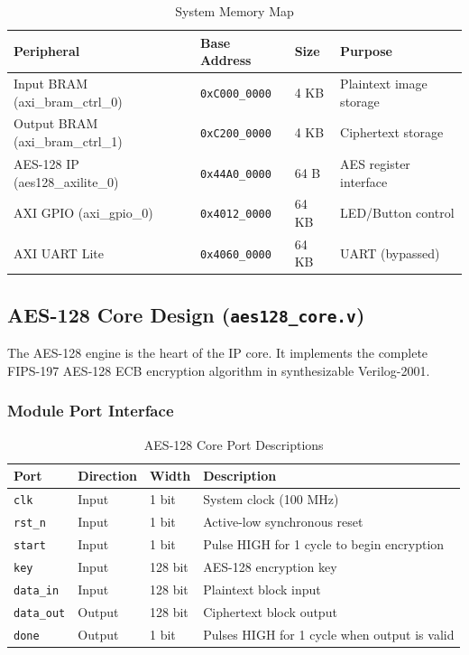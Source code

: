 \begin{table}[H]
\centering
\caption{System Memory Map}
\begin{tabular}{llll}
\toprule
\textbf{Peripheral} & \textbf{Base Address} & \textbf{Size} & \textbf{Purpose} \\
\midrule
Input BRAM (axi\_bram\_ctrl\_0)  & \texttt{0xC000\_0000} & 4 KB & Plaintext image storage \\
Output BRAM (axi\_bram\_ctrl\_1) & \texttt{0xC200\_0000} & 4 KB & Ciphertext storage \\
AES-128 IP (aes128\_axilite\_0)  & \texttt{0x44A0\_0000} & 64 B & AES register interface \\
AXI GPIO (axi\_gpio\_0)          & \texttt{0x4012\_0000} & 64 KB & LED/Button control \\
AXI UART Lite                    & \texttt{0x4060\_0000} & 64 KB & UART (bypassed) \\
\bottomrule
\end{tabular}
\end{table}

\subsection{AES-128 Core Design (\texttt{aes128\_core.v})}

The AES-128 engine is the heart of the IP core. It implements the complete FIPS-197 AES-128 ECB encryption algorithm in synthesizable Verilog-2001.

\subsubsection{Module Port Interface}

\begin{table}[H]
\centering
\caption{AES-128 Core Port Descriptions}
\begin{tabular}{llll}
\toprule
\textbf{Port} & \textbf{Direction} & \textbf{Width} & \textbf{Description} \\
\midrule
\texttt{clk}      & Input  & 1 bit  & System clock (100 MHz) \\
\texttt{rst\_n}   & Input  & 1 bit  & Active-low synchronous reset \\
\texttt{start}    & Input  & 1 bit  & Pulse HIGH for 1 cycle to begin encryption \\
\texttt{key}      & Input  & 128 bit & AES-128 encryption key \\
\texttt{data\_in} & Input  & 128 bit & Plaintext block input \\
\texttt{data\_out}& Output & 128 bit & Ciphertext block output \\
\texttt{done}     & Output & 1 bit  & Pulses HIGH for 1 cycle when output is valid \\
\bottomrule
\end{tabular}
\end{table}

